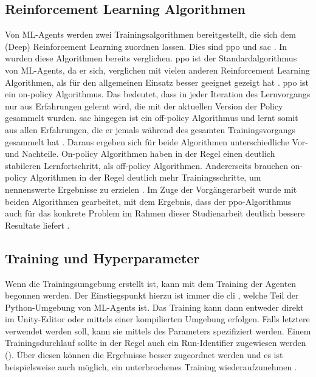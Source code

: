 \subsection{Reinforcement Learning Algorithmen}
Von ML-Agents werden zwei Trainingsalgorithmen bereitgestellt, die sich dem (Deep) Reinforcement Learning zuordnen lassen.
Dies sind \acf{ppo} und \acf{sac} \cite{mlagentsOverview}.
In \cite{waidner.2020} wurden diese Algorithmen bereits verglichen.
\ac{ppo} ist der Standardalgorithmus von ML-Agents, da er sich, verglichen mit vielen anderen Reinforcement Learning Algorithmen, als für den allgemeinen Einsatz besser geeignet gezeigt hat \cite{schulman2017proximal,openaiPPO}.
\ac{ppo} ist ein on-policy Algorithmus.
Das bedeutet, dass in jeder Iteration des Lernvorgangs nur aus Erfahrungen gelernt wird, die mit der aktuellen Version der Policy gesammelt wurden.
\ac{sac} hingegen ist ein off-policy Algorithmus und lernt somit aus allen Erfahrungen, die er jemals während des gesamten Trainingsvorgangs gesammelt hat \cite{suran2020,sagar2020}.
Daraus ergeben sich für beide Algorithmen unterschiedliche Vor- und Nachteile.
On-policy Algorithmen haben in der Regel einen deutlich stabileren Lernfortschritt, als off-policy Algorithmen.
Andererseits brauchen on-policy Algorithmen in der Regel deutlich mehr Trainingsschritte, um nennenswerte Ergebnisse zu erzielen \cite{mlagentsOverview}.
Im Zuge der Vorgängerarbeit wurde mit beiden Algorithmen gearbeitet, mit dem Ergebnis, dass der \ac{ppo}-Algorithmus auch für das konkrete Problem im Rahmen dieser Studienarbeit deutlich bessere Resultate liefert \cite[48]{waidner.2020}.

\subsection{Training und Hyperparameter}
\label{sec:training}
Wenn die Trainingsumgebung erstellt ist, kann mit dem Training der Agenten begonnen werden.
Der Einstiegspunkt hierzu ist immer die \ac{cli} , welche Teil der Python-Umgebung von ML-Agents ist.
Das Training kann dann entweder direkt im Unity-Editor oder mittels einer kompilierten Umgebung erfolgen.
Falls letztere verwendet werden soll, kann sie mittels des Parameters  spezifiziert werden.
Einem Trainingsdurchlauf sollte in der Regel auch ein Run-Identifier zugewiesen werden ().
Über diesen können die Ergebnisse besser zugeordnet werden und es ist beispielsweise auch möglich, ein unterbrochenes Training wiederaufzunehmen \cite{mlagentsTraining}.

